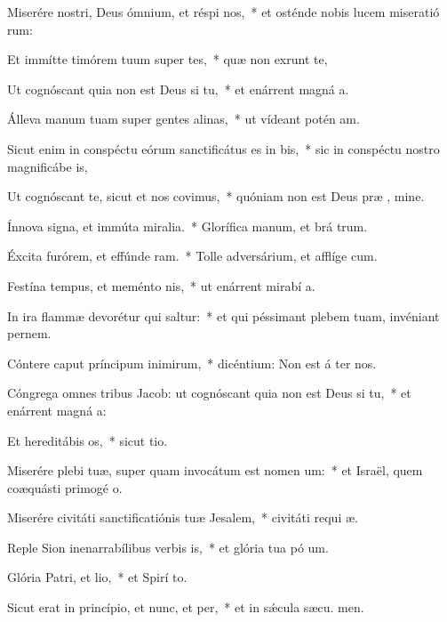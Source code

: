 \item Miserére nostri, Deus ómnium, et réspi nos,~* et osténde nobis lucem miseratió rum:
\item Et immítte timórem tuum super tes,~* quæ non exrunt te,
\item Ut cognóscant quia non est Deus si tu,~* et enárrent magná a.
\item Álleva manum tuam super gentes alinas,~* ut vídeant potén am.
\item Sicut enim in conspéctu eórum sanctificátus es in bis,~* sic in conspéctu nostro magnificábe  is,
\item Ut cognóscant te, sicut et nos covimus,~* quóniam non est Deus præ , mine.
\item Ínnova signa, et immúta miralia.~* Glorífica manum, et brá trum.
\item Éxcita furórem, et effúnde ram.~* Tolle adversárium, et afflíge cum.
\item Festína tempus, et meménto nis,~* ut enárrent mirabí a.
\item In ira flammæ devorétur qui saltur:~* et qui péssimant plebem tuam, invéniant pernem.
\item Cóntere caput príncipum inimirum,~* dicéntium: Non est á ter nos.
\item Cóngrega omnes tribus Jacob: ut cognóscant quia non est Deus si tu,~* et enárrent magná a:
\item Et hereditábis os,~* sicut  tio.
\item Miserére plebi tuæ, super quam invocátum est nomen um:~* et Israël, quem coæquásti primogé o.
\item Miserére civitáti sanctificatiónis tuæ Jesalem,~* civitáti requi æ.
\item Reple Sion inenarrabílibus verbis is,~* et glória tua pó um.
\item Glória Patri, et lio,~* et Spirí to.
\item Sicut erat in princípio, et nunc, et per,~* et in sǽcula sæcu. men.
